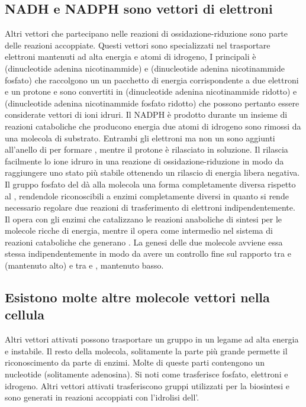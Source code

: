 \subsection{NADH e NADPH sono vettori di elettroni}
Altri vettori che partecipano nelle reazioni di ossidazione-riduzione sono parte delle reazioni accoppiate. Questi vettori sono specializzati nel trasportare elettroni mantenuti ad
alta energia e atomi di idrogeno, I principali \`e  (dinucleotide adenina nicotinammide) e  (dinucleotide adenina nicotinammide fosfato) che raccolgono un un pacchetto
di energia corrispondente a due elettroni e un protone  e sono convertiti in  (dinucleotide adenina nicotinammide ridotto) e  (dinucleotide adenina 
nicotinammide fosfato ridotto) che possono pertanto essere considerate vettori di ioni idruri. Il NADPH \`e prodotto durante un insieme di reazioni cataboliche che producono energia 
due atomi di idrogeno sono rimossi da una molecola di substrato. Entrambi gli elettroni ma non un  sono aggiunti all'anello di  per formare , mentre il protone
 \`e rilasciato in soluzione. Il  rilascia facilmente lo ione idruro in una reazione di ossidazione-riduzione in modo da raggiungere uno stato pi\`u stabile ottenendo
un rilascio di energia libera negativa. Il gruppo fosfato del  d\`a alla molecola una forma completamente diversa rispetto al , rendendole riconoscibili a enzimi 
completamente diversi in quanto si rende necessario regolare due reazioni di trasferimento di elettroni indipendentemente. Il  opera con gli enzimi che catalizzano le reazioni 
anaboliche di sintesi per le molecole ricche di energia, mentre il  opera come intermedio nel sistema di reazioni cataboliche che generano . La genesi delle due molecole
avviene essa stessa indipendentemente in modo da avere un controllo fine sul rapporto tra  e  (mantenuto alto) e tra  e , mantenuto basso. 
\subsection{Esistono molte altre molecole vettori nella cellula}
Altri vettori attivati possono trasportare un gruppo in un legame ad alta energia e instabile. Il resto della molecola, solitamente la parte pi\`u grande permette il riconoscimento da
parte di enzimi. Molte di queste parti contengono un nucleotide (solitamente adenosina). Si noti come  trasferisce fosfato,  elettroni e idrogeno. Altri vettori 
attivati trasferiscono gruppi utilizzati per la biosintesi e sono generati in reazioni accoppiati con l'idrolisi dell'.
